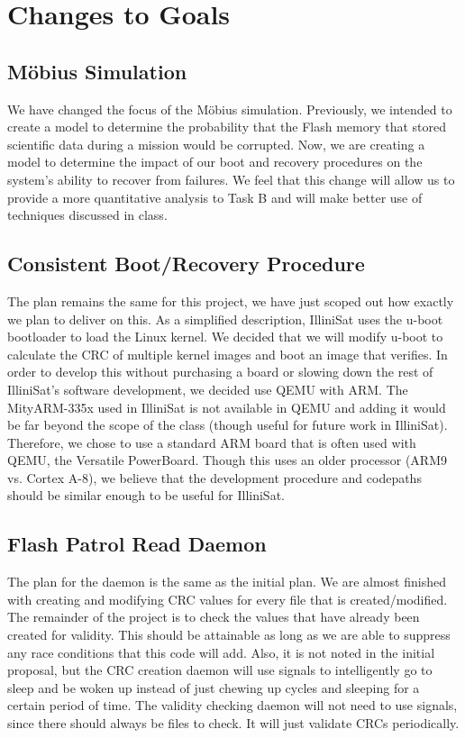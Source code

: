 \section{Changes to Goals} 

\subsection{M\"obius Simulation}
We have changed the focus of the M\"obius simulation.  Previously, we intended to create a model to determine the probability that the Flash memory that stored scientific data during a mission would be corrupted.  Now, we are creating a model to determine the impact of our boot and recovery procedures on the system's ability to recover from failures.  We feel that this change will allow us to provide a more quantitative analysis to Task B and will make better use of techniques discussed in class.

\subsection{Consistent Boot/Recovery Procedure}
The plan remains the same for this project, we have just scoped out how exactly
we plan to deliver on this. As a simplified description, IlliniSat uses the
u-boot bootloader to load the Linux kernel.  We decided that we will modify
u-boot to calculate the CRC of multiple kernel images and boot an image that
verifies.  In order to develop this without purchasing a board or slowing down
the rest of IlliniSat's software development, we decided use QEMU with ARM. The
MityARM-335x used in IlliniSat is not available in QEMU and adding it would be
far beyond the scope of the class (though useful for future work in IlliniSat).
Therefore, we chose to use a standard ARM board that is often used with QEMU,
the Versatile PowerBoard.  Though this uses an older processor (ARM9 vs. Cortex
A-8), we believe that the development procedure and codepaths should be similar
enough to be useful for IlliniSat.


\subsection{Flash Patrol Read Daemon}
The plan for the daemon is the same as the initial plan. We are almost finished
with creating and modifying CRC values for every file that is created/modified.
The remainder of the project is to check the values that have already been
created for validity.  This should be attainable as long as we are able to
suppress any race conditions that this code will add. Also, it is not noted in
the initial proposal, but the CRC creation daemon will use signals to
intelligently go to sleep and be woken up instead of just chewing up cycles and
sleeping for a certain period of time. The validity checking daemon will not
need to use signals, since there should always be files to check. It will just
validate CRCs periodically.
